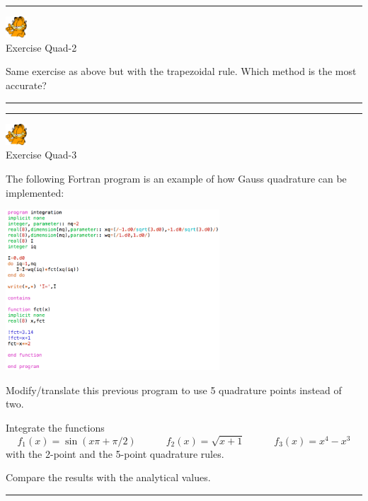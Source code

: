\begin{center}
\begin{minipage}[t]{0.77\textwidth}
\par\noindent\rule{\textwidth}{0.4pt}

\begin{center}
\includegraphics[width=0.8cm]{images/garftr} \\
{\color{orange}Exercise Quad-2}
\end{center}

Same exercise as above but with the trapezoidal rule. 
Which method is the most accurate?

\par\noindent\rule{\textwidth}{0.4pt}
\end{minipage}
\end{center}

\begin{center}
\begin{minipage}[t]{0.77\textwidth}
\par\noindent\rule{\textwidth}{0.4pt}

\begin{center}
\includegraphics[width=0.8cm]{images/garftr} \\
{\color{orange}Exercise Quad-3}
\end{center}

The following Fortran program is an example of how Gauss quadrature 
can be implemented:

\begin{center}
\includegraphics[width=8cm]{images/quadrature/gq3} 
\end{center}

Modify/translate this previous program to use 5 quadrature points instead of two.

Integrate the functions
\[
f_1(x)=\sin(x\pi+\pi/2)
\quad\quad\quad
f_2(x)=\sqrt{x+1}
\quad\quad\quad
f_3(x)=x^4-x^3
\]
with the 2-point and the 5-point quadrature rules.

Compare the results with the analytical values.

\par\noindent\rule{\textwidth}{0.4pt}
\end{minipage}
\end{center}

